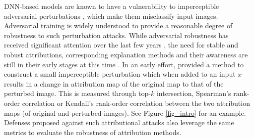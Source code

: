 \documentclass[letterpaper]{article} %
\begin{document}
DNN-based models are known to have a vulnerability to imperceptible adversarial perturbations \citep{Biggio_2013,szegedy2014intriguing,goodfellow15fgsm}, which make them misclassify input images. %
Adversarial training \citep{madry2019deep} is widely understood to provide a reasonable degree of robustness to such perturbation attacks.
While adversarial robustness has received significant attention over the last few years \citep{ozdag2018advsurvey,silva2020advrobustsurvey}, the need for stable and robust attributions, corresponding explanation methods and their awareness are still in their early stages at this time \citep{ghorbani2018interpretation,chen2019robust,slack2020fooling,sarkar2020enhanced,lakkaraju2020icml,slack2021neurips-a,slack2021neurips-b}. In an early effort, \citep{ghorbani2018interpretation} provided a method to construct a small imperceptible perturbation which when added to an input $x$ results in a change in attribution map of the original map to that of the perturbed image. This is measured through top-$k$ intersection, Spearman's rank-order correlation or Kendall's rank-order correlation between the two attribution maps (of original and perturbed images). See Figure \ref{fig_intro} for an example. Defenses proposed against such attributional attacks %
\citep{chen2019robust,singh2020attributional,wang2020smoothed,sarkar2020enhanced}
also leverage the same metrics to evaluate the robustness of attribution methods.
\end{document}
